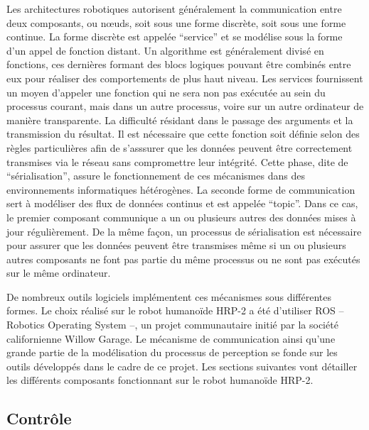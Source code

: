 Les architectures robotiques autorisent généralement la communication
entre deux composants, ou n\oe uds, soit sous une forme discrète, soit
sous une forme continue. La forme discrète est appelée
``service'' et se modélise sous la forme d'un appel de
fonction distant. Un algorithme est généralement divisé en fonctions,
ces dernières formant des blocs logiques pouvant être combinés entre
eux pour réaliser des comportements de plus haut niveau. Les services
fournissent un moyen d'appeler une fonction qui ne sera non pas
exécutée au sein du processus courant, mais dans un autre processus,
voire sur un autre ordinateur de manière transparente. La difficulté
résidant dans le passage des arguments et la transmission du
résultat. Il est nécessaire que cette fonction soit définie selon des
règles particulières afin de s'asssurer que les données peuvent être
correctement transmises via le réseau sans compromettre leur
intégrité. Cette phase, dite de ``sérialisation'',
assure le fonctionnement de ces mécanismes dans des environnements
informatiques hétérogènes. La seconde forme de communication sert à
modéliser des flux de données continus et est appelée
``topic''. Dans ce cas, le premier composant communique a
un ou plusieurs autres des données mises à jour régulièrement. De la
même façon, un processus de sérialisation est nécessaire pour assurer
que les données peuvent être transmises même si un ou plusieurs autres
composants ne font pas partie du même processus ou ne sont pas
exécutés sur le même ordinateur.


De nombreux outils logiciels implémentent ces mécanismes sous
différentes formes. Le choix réalisé sur le robot humanoïde HRP-2 a
été d'utiliser ROS -- Robotics Operating System --, un
projet communautaire initié par la société californienne Willow
Garage. Le mécanisme de communication ainsi
qu'une grande partie de la modélisation du processus de perception se
fonde sur les outils développés dans le cadre de ce projet. Les
sections suivantes vont détailler les différents composants
fonctionnant sur le robot humanoïde HRP-2.



\subsection{Contrôle}

